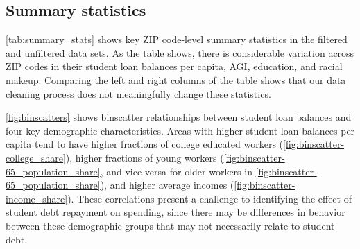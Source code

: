 \documentclass[12pt]{article}
\begin{document}
\subsection{Summary statistics}


\cref{tab:summary_stats} shows key ZIP code-level summary statistics in the filtered and unfiltered data sets. As the table shows, there is considerable variation across ZIP codes in their student loan balances per capita, AGI, education, and racial makeup. Comparing the left and right columns of the table shows that our data cleaning process does not meaningfully change these statistics. 



 \cref{fig:binscatters} shows binscatter relationships between student loan balances and four key demographic characteristics. Areas with higher student loan balances per capita tend to have higher fractions of college educated workers (\cref{fig:binscatter-college_share}), higher fractions of young workers (\cref{fig:binscatter-65_population_share}, and vice-versa for older workers in \cref{fig:binscatter-65_population_share}), and higher average incomes (\cref{fig:binscatter-income_share}). These correlations present a challenge to identifying the effect of student debt repayment on spending, since there may be differences in behavior between these demographic groups that may not necessarily relate to student debt. 
\end{document}
